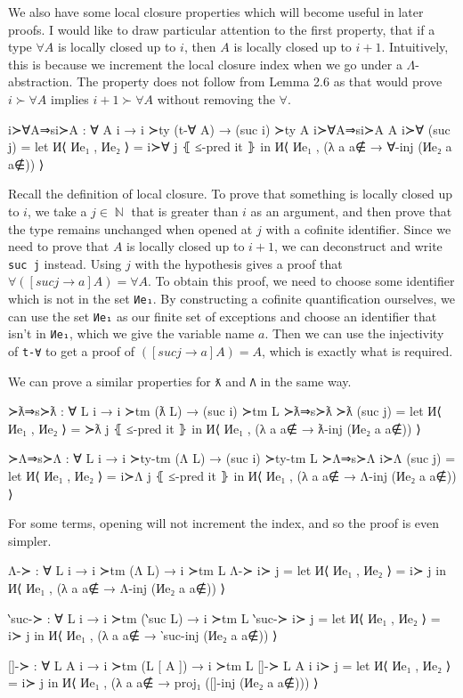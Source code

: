 \documentclass[logo,bsc,singlespacing,parskip,online]{infthesis}
\DeclareMathOperator{\nat}{\mathbb{N}}
\begin{document}
We also have some local closure properties which will become useful in later proofs. I would like to
draw particular attention to the first property, that if a type $\forall A$ is locally closed up to
$i$, then $A$ is locally closed up to $i + 1$. Intuitively, this is because we increment the local
closure index when we go under a $\Lambda$-abstraction. The property does not follow from Lemma 2.6
as that would prove $i \succ \forall A$ implies $i + 1 \succ \forall A$ without removing the
$\forall$.
\begin{code}
  i≻∀A⇒si≻A : ∀ {A i} → i ≻ty (t-∀ A) → (suc i) ≻ty A
  i≻∀A⇒si≻A {A} i≻∀ (suc j) =
    let И⟨ Иe₁ , Иe₂ ⟩ = i≻∀ j ⦃ ≤-pred it ⦄
    in И⟨ Иe₁ , (λ a {a∉} → ∀-inj (Иe₂ a {a∉})) ⟩
\end{code}

Recall the definition of local closure. To prove that something is locally closed up to $i$, we take
a $j \in \nat$ that is greater than $i$ as an argument, and then prove that the type remains
unchanged when opened at $j$ with a cofinite identifier. Since we need to prove that $A$ is locally
closed up to $i + 1$, we can deconstruct and write \texttt{suc j} instead. Using $j$ with the
hypothesis gives a proof that $\forall ([suc j \to a] A) = \forall A$. To obtain this proof, we need
to choose some identifier which is not in the set \texttt{Иe₁}. By constructing a cofinite
quantification ourselves, we can use the set \texttt{Иe₁} as our finite set of exceptions and choose
an identifier that isn't in \texttt{Иe₁}, which we give the variable name $a$. Then we can use the
injectivity of \texttt{t-∀} to get a proof of $([suc j \to a] A) = A$, which is exactly what is
required.

We can prove a similar properties for \texttt{ƛ} and \texttt{Λ} in the same way.
\begin{code}
  ≻ƛ⇒s≻ƛ : ∀ {L i} → i ≻tm (ƛ L) → (suc i) ≻tm L
  ≻ƛ⇒s≻ƛ ≻ƛ (suc j) = let И⟨ Иe₁ , Иe₂ ⟩ = ≻ƛ j ⦃ ≤-pred it ⦄
    in И⟨ Иe₁ , (λ a {a∉} → ƛ-inj (Иe₂ a {a∉})) ⟩

  ≻Λ⇒s≻Λ : ∀ {L i} → i ≻ty-tm (Λ L) → (suc i) ≻ty-tm L
  ≻Λ⇒s≻Λ i≻Λ (suc j) = let И⟨ Иe₁ , Иe₂ ⟩ = i≻Λ j ⦃ ≤-pred it ⦄
    in И⟨ Иe₁ , (λ a {a∉} → Λ-inj (Иe₂ a {a∉})) ⟩
\end{code}

For some terms, opening will not increment the index, and so the proof is even simpler.
\begin{code}
  Λ-≻ : ∀ {L i} → i ≻tm (Λ L) → i ≻tm L
  Λ-≻ i≻ j = let И⟨ Иe₁ , Иe₂ ⟩ = i≻ j
    in И⟨ Иe₁ , (λ a {a∉} → Λ-inj (Иe₂ a {a∉})) ⟩

  ‵suc-≻ : ∀ {L i} → i ≻tm (‵suc L) → i ≻tm L
  ‵suc-≻ i≻ j = let И⟨ Иe₁ , Иe₂ ⟩ = i≻ j
    in И⟨ Иe₁ , (λ a {a∉} → ‵suc-inj (Иe₂ a {a∉})) ⟩

  []-≻ : ∀ {L A i} → i ≻tm (L [ A ]) → i ≻tm L
  []-≻ {L} {A} {i} i≻ j = let И⟨ Иe₁ , Иe₂ ⟩ = i≻ j
    in И⟨ Иe₁ , (λ a {a∉} → proj₁ ([]-inj (Иe₂ a {a∉}))) ⟩
\end{code}
\end{document}
